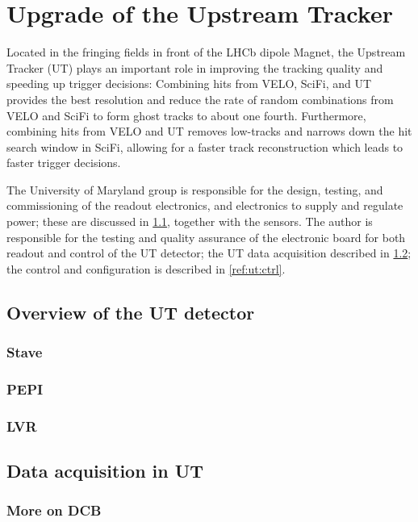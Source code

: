 \chapter{Upgrade of the Upstream Tracker}
\label{ref:ut}

Located in the fringing fields in front of the LHCb dipole Magnet,
the Upstream Tracker (UT) plays an important role in improving the tracking
quality and speeding up trigger decisions:
Combining hits from VELO, SciFi, and UT provides the best \pt resolution
and reduce the rate of random combinations from VELO and SciFi to form
ghost tracks to about one fourth.
Furthermore, combining hits from VELO and UT removes low-\pt tracks and narrows
down the hit search window in SciFi, allowing for a faster track reconstruction
which leads to faster trigger decisions.

The University of Maryland group is responsible for the design, testing, and
commissioning of the readout electronics, and electronics to supply and regulate
power;
these are discussed in \cref{ref:ut:overview},
together with the sensors.
The author is responsible for the testing and quality assurance of the
electronic board for both readout and control of the UT detector;
the UT data acquisition described in \cref{ref:ut:daq};
the control and configuration is described in \cref{ref:ut:ctrl}.


\section{Overview of the UT detector}
\label{ref:ut:overview}

\subsection{Stave}


\subsection{PEPI}


\subsection{LVR}


\section{Data acquisition in UT}
\label{ref:ut:daq}

\subsection{More on DCB}


